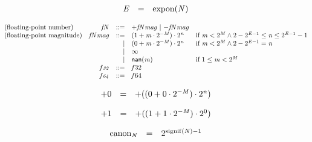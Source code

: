$$
\begin{array}{@{}lcl@{}l@{}}
{\mathit{E}} &=& {\mathrm{expon}}({\mathit{N}}) &  \\
\end{array}
$$

$$
\begin{array}{@{}lrrl@{}l@{}}
\mbox{(floating-point number)} & {{\mathit{f}}}{{\mathit{N}}} &::=& {+{{{\mathit{f}}}{{\mathit{N}}}}{{\mathit{mag}}}} ~|~ {-{{{\mathit{f}}}{{\mathit{N}}}}{{\mathit{mag}}}} \\
\mbox{(floating-point magnitude)} & {{{\mathit{f}}}{{\mathit{N}}}}{{\mathit{mag}}} &::=& (1 + {\mathit{m}} \cdot {2^{{-{\mathit{M}}}}}) \cdot {2^{{\mathit{n}}}} &\quad
  \mbox{if}~{\mathit{m}} < {2^{{\mathit{M}}}} \land 2 - {2^{{\mathit{E}} - 1}} \leq {\mathit{n}} \leq {2^{{\mathit{E}} - 1}} - 1 \\ &&|&
(0 + {\mathit{m}} \cdot {2^{{-{\mathit{M}}}}}) \cdot {2^{{\mathit{n}}}} &\quad
  \mbox{if}~{\mathit{m}} < {2^{{\mathit{M}}}} \land 2 - {2^{{\mathit{E}} - 1}} = {\mathit{n}} \\ &&|&
\infty \\ &&|&
{\mathsf{nan}}{({\mathit{m}})} &\quad
  \mbox{if}~1 \leq {\mathit{m}} < {2^{{\mathit{M}}}} \\
& {\mathit{f{\scriptstyle32}}} &::=& {{\mathit{f}}}{32} \\
& {\mathit{f{\scriptstyle64}}} &::=& {{\mathit{f}}}{64} \\
\end{array}
$$

$$
\begin{array}{@{}lcl@{}l@{}}
{+0} &=& {+((0 + 0 \cdot {2^{{-{\mathit{M}}}}}) \cdot {2^{{\mathit{n}}}})} &  \\
\end{array}
$$

$$
\begin{array}{@{}lcl@{}l@{}}
{+1} &=& {+((1 + 1 \cdot {2^{{-{\mathit{M}}}}}) \cdot {2^{0}})} &  \\
\end{array}
$$

$$
\begin{array}{@{}lcl@{}l@{}}
{{\mathrm{canon}}}_{{\mathit{N}}} &=& {2^{{\mathrm{signif}}({\mathit{N}}) - 1}} &  \\
\end{array}
$$

\vspace{1ex}

